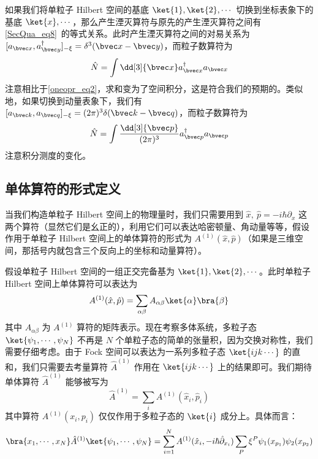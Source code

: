 如果我们将单粒子 Hilbert 空间的基底 $\ket{1},\ket{2},\cdots$ 切换到坐标表象下的基底 $\ket{x},\cdots$，那么产生湮灭算符与原先的产生湮灭算符之间有\autoref{SecQua_eq8}~的等式关系。此时产生湮灭算符之间的对易关系为 $[a_{\bvec x},a_{\bvec y}^\dagger]_{-\xi}=\delta^3(\bvec x-\bvec y)$，而粒子数算符为
\begin{equation}
\begin{aligned}
\hat N=\int \dd[3]{\bvec x} a^\dagger_{\bvec x} a_{\bvec x}
\end{aligned}
\end{equation}
注意相比于\autoref{oneopr_eq2}，求和变为了空间积分，这是符合我们的预期的。类似地，如果切换到动量表象下，我们有 $[a_{\bvec k},a_{\bvec q}]_{-\xi}= (2\pi)^3 \delta(\bvec k-\bvec q)$，而粒子数算符为
\begin{equation}
\begin{aligned}
\hat N=\int \frac{\dd[3]{\bvec p}}{(2\pi)^3} a^\dagger_{\bvec p} a_{\bvec p}
\end{aligned}
\end{equation}
注意积分测度的变化。
\subsection{单体算符的形式定义}
当我们构造单粒子 Hilbert 空间上的物理量时，我们只需要用到 $\hat x,\ \hat p=-i\hbar \partial_x$ 这两个算符（显然它们是幺正的），利用它们可以表达哈密顿量、角动量等等，假设作用于单粒子 Hilbert 空间上的单体算符的形式为 $A^{(1)}(\hat x,\hat p)$（如果是三维空间，那括号内就包含三个反向上的坐标和动量算符）。

假设单粒子 Hilbert 空间的一组正交完备基为 $\ket{1},\ket{2},\cdots$。此时单粒子 Hilbert 空间上单体算符可以表达为
\begin{equation}
A^{(1)}(\hat x,\hat p)=\sum_{\alpha\beta}A_{\alpha\beta} \ket{\alpha}\bra{\beta}
\end{equation}
其中 $A_{\alpha\beta}$ 为 $A^{(1)}$ 算符的矩阵表示。现在考察多体系统，多粒子态 $\ket{\psi_1,\cdots,\psi_N}$ 不再是 $N$ 个单粒子态的简单的张量积，因为交换对称性，我们需要仔细考虑。由于 Fock 空间可以表达为一系列多粒子态 $\ket{ijk\cdots}$ 的直和，我们只需要去考量算符 $\hat A^{(1)}$ 作用在 $\ket{ijk\cdots}$ 上的结果即可。我们期待单体算符 $\hat A^{(1)}$ 能够被写为
\begin{equation}
\hat A^{(1)}=\sum_{i} A^{(1)}(\hat x_i,\hat p_i)
\end{equation}
其中算符 $A^{(1)}(x_i,p_i)$ 仅仅作用于多粒子态的 $\ket{i}$ 成分上。具体而言：
\begin{equation}
\bra{x_1,\cdots,x_N}\hat A^{(1)} \ket{\psi_1,\cdots,\psi_N}=\sum_{i=1}^N A^{(1)}(\hat x_i,-i\hbar\hat\partial_{x_i})\sum_{P} \xi^P \psi_1(x_{p_1})\psi_2(x_{p_2})
\end{equation}
